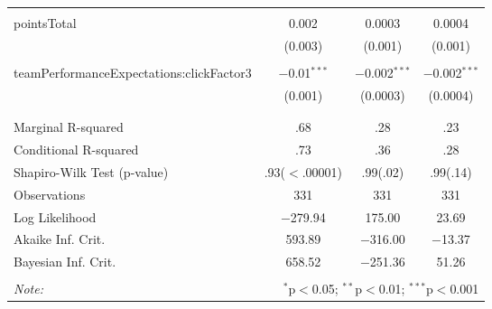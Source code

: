 \begin{table}[!htbp]
\begin{tabular}{@{\extracolsep{5pt}}lccc}
  & & & \\ 
 pointsTotal & 0.002 & 0.0003 & 0.0004 \\ 
  & (0.003) & (0.001) & (0.001) \\ 
  & & & \\ 
 teamPerformanceExpectations:clickFactor3 & $-$0.01$^{***}$ & $-$0.002$^{***}$ & $-$0.002$^{***}$ \\ 
  & (0.001) & (0.0003) & (0.0004) \\ 
  & & & \\ 
\hline \\[-1.8ex] 
Marginal R-squared & .68 & .28 & .23 \\ 
Conditional R-squared & .73 & .36 & .28 \\ 
Shapiro-Wilk Test (p-value) & .93($<$.00001) & .99(.02) & .99(.14) \\ 
Observations & 331 & 331 & 331 \\ 
Log Likelihood & $-$279.94 & 175.00 & 23.69 \\ 
Akaike Inf. Crit. & 593.89 & $-$316.00 & $-$13.37 \\ 
Bayesian Inf. Crit. & 658.52 & $-$251.36 & 51.26 \\ 
\hline 
\hline \\[-1.8ex] 
\textit{Note:}  & \multicolumn{3}{r}{$^{*}$p$<$0.05; $^{**}$p$<$0.01; $^{***}$p$<$0.001} \\ 
\end{tabular} 
\end{table} 

